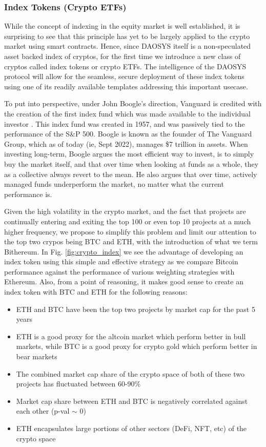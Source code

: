 \documentclass[journal,twocolumn,12pt]{ieeesyscoin}
\begin{document}
\subsubsection{Index Tokens (Crypto ETFs)}

While the concept of indexing in the equity market is well established, it is surprising to see that this principle has yet to be largely applied to the crypto market using smart contracts. Hence, since DAOSYS itself is a non-speculated asset backed index of cryptos, for the first time we introduce a new class of cryptos called index tokens or crypto ETFs. The intelligence of the DAOSYS protocol will allow for the seamless, secure deployment of these index tokens using one of its readily available templates addressing this important usecase.

To put into perspective, under John Boogle’s direction, Vanguard is credited with the creation of the first index fund which was made available to the individual investor \cite{Bog17}. This index fund was created in 1957, and was passively tied to the performance of the S\&P 500. Boogle is known as the founder of The Vanguard Group, which as of today (ie, Sept 2022), manages \$7 trillion in assets. When investing long-term, Boogle argues the most efficient way to invest, is to simply buy the market itself, and that over time when looking at funds as a whole, they as a collective always revert to the mean. He also argues that over time, actively managed funds underperform the market, no matter what the current performance is.

Given the high volatility in the crypto market, and the fact that projects are continually entering and exiting the top 100 or even top 10 projects at a much higher frequency, we propose to simplify this problem and limit our attention to the top two crypos being BTC and ETH, with the introduction of what we term Bithereum. In Fig. \ref{fig:crypto_index} we see the advantage of developing an index token using this simple and effective strategy as we compare Bitcoin performance against the performance of various weighting strategies with Ethereum. Also, from a point of reasoning, it makes good sense to create an index token with BTC and ETH for the following reasons:

\begin{itemize}
  \item ETH and BTC have been the top two projects by market cap for the past 5 years
  \item ETH is a good proxy for the altcoin market which perform better in bull markets, while BTC is a good proxy for crypto gold which perform better in bear markets
  \item The combined market cap share of the crypto space of both of these two projects has fluctuated between 60-90\%
  \item Market cap share between ETH and BTC is negatively correlated against each other (p-val $\sim$ 0)
  \item ETH encapsulates large portions of other sectors (DeFi, NFT, etc) of the crypto space
\end{itemize}  
\end{document}
